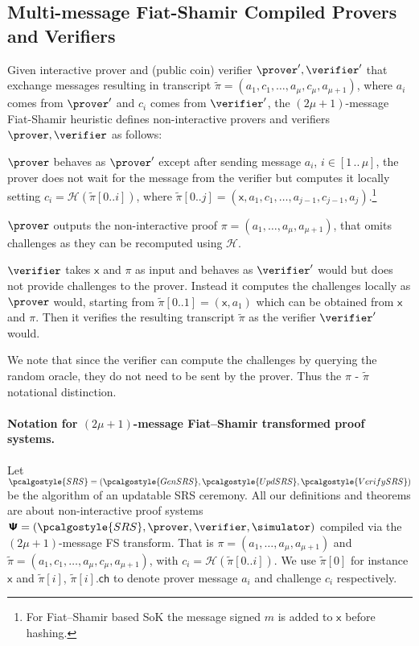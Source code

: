 \documentclass[10pt]{llncs}
\newcommand{\SRScer}{\pcalgostyle{SRS}}
\renewcommand{\kgen}{\pcalgostyle{GenSRS}}
\newcommand{\upd}{\pcalgostyle{UpdSRS}}
\newcommand{\verifyCRS}{\pcalgostyle{VerifySRS}}
\newcommand{\pcvarstyle}[1]{\mathsf{#1}}
\newcommand{\range}[2] {[#1 \, .. \, #2]}
\newcommand{\zkproof}{\pi}
\newcommand{\tzkproof}{\tilde{\zkproof}}
\newcommand{\proofsystem}{\pcschemestyle{\Psi}}
\newcommand{\ps}{\proofsystem}
\newcommand{\ro}{\mathcal{H}}
\newcommand{\pcschemestyle}[1]{\bm{\mathsf{#1}}}
\newcommand{\ch}{\pcvarstyle{ch}}
\newcommand{\inp}{\pcvarstyle{x}}
\DeclareRobustCommand{\markulf}[2] {}%
\begin{document}
\subsection{Multi-message Fiat-Shamir Compiled Provers and Verifiers}
Given interactive prover and (public coin) verifier $\prover', \verifier'$ that exchange messages resulting in transcript $\tzkproof = (a_1, c_1, \ldots, a_{\mu}, c_{\mu}, a_{\mu + 1})$, where $a_i$ comes from
$\prover'$ and $c_i$ comes from $\verifier'$, the $(2\mu + 1)$-message Fiat-Shamir heuristic defines non-interactive provers and verifiers $\prover, \verifier$ as follows:

\begin{compactitem}
	\item $\prover$ behaves as $\prover'$ except after sending message
	$a_i$, $i \in \range{1}{\mu}$, the prover does not wait for
	the message from the verifier but computes it locally setting $c_i
	= \ro(\tzkproof[0..i])$, where $\tzkproof[0..j] = (\inp, a_1, c_1, \ldots,
	a_{j - 1}, c_{j - 1}, a_j)$.\footnote{For Fiat--Shamir based SoK the message signed $m$ is added to $\inp$ before hashing.} 
	
	$\prover$ outputs the non-interactive proof $\pi=(a_1,\ldots, a_{\mu}, a_{\mu + 1})$, that omits challenges as they can be recomputed using $\ro$.
	
	\item $\verifier$ takes $\inp$ and $\pi$ as input and behaves as $\verifier'$ would but does not provide
	challenges to the prover. Instead it computes the
	challenges locally as $\prover$ would, starting from $\tzkproof[0..1]=(\inp,a_1)$ which can be obtained from $\inp$ and $\pi$. Then it verifies the
	resulting transcript $\tzkproof$ as the verifier $\verifier'$ would. 
\end{compactitem}
We note that since the verifier can compute the challenges by querying the random oracle, they do not need to be sent by the prover. Thus the $\zkproof$ - $\tzkproof$ notational distinction.
\paragraph{Notation for $(2\mu + 1)$-message Fiat--Shamir transformed proof systems.}
Let $\SRScer= (\kgen,\upd, \verifyCRS)$ be the algorithm of an updatable SRS ceremony.
All our definitions and theorems are about non-interactive proof systems $\ps = (\SRScer, \prover, \verifier, \simulator)$ compiled via the $(2\mu + 1)$-message FS transform. 
%
That is $\pi = (a_1, \ldots, a_{\mu}, a_{\mu + 1})$ and $\tzkproof = (a_1, c_1, \ldots, a_{\mu}, c_{\mu}, a_{\mu + 1})$, with $c_i
= \ro(\tzkproof[0..i])$.
%
We use $\tzkproof[0]$ for instance
$\inp$  and $\tzkproof[i]$, $\tzkproof[i].\ch$ to denote prover
message $a_i$ and challenge $c_i$ respectively. %
\end{document}
